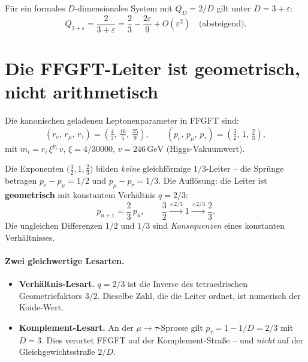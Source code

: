 Für ein formales \(D\)-dimensionales System mit \(Q_D = 2/D\) gilt
unter \(D = 3+\varepsilon\):
\begin{equation}
  Q_{3+\varepsilon} = \frac{2}{3+\varepsilon}
  = \frac{2}{3} - \frac{2\varepsilon}{9} + O(\varepsilon^2)
  \quad \text{(absteigend)}.
\end{equation}

\section{Die FFGFT-Leiter ist geometrisch, nicht arithmetisch}
\label{sec:leiter}

Die kanonischen geladenen Leptonenparameter in FFGFT
\cite{Pascher2026,PascherDok006} sind:
\begin{equation}
  (r_e,\, r_\mu,\, r_\tau) = \left(\tfrac{4}{3},\, \tfrac{16}{5},\, \tfrac{25}{9}\right),
  \qquad
  (p_e,\, p_\mu,\, p_\tau) = \left(\tfrac{3}{2},\, 1,\, \tfrac{2}{3}\right),
\end{equation}
mit \(m_i = r_i\,\xi^{p_i}\,v\), \(\xi = 4/30000\),
\(v = 246\,\text{GeV}\) (Higgs-Vakuumwert).

Die Exponenten \(\bigl(\tfrac{3}{2}, 1, \tfrac{2}{3}\bigr)\) bilden
\emph{keine} gleichförmige \(1/3\)-Leiter -- die Sprünge betragen
\(p_e - p_\mu = 1/2\) und \(p_\mu - p_\tau = 1/3\).
Die Auflösung: die Leiter ist \textbf{geometrisch} mit konstantem
Verhältnis \(q = 2/3\):
\begin{equation}
  p_{n+1} = \frac{2}{3}\,p_n, \qquad
  \frac{3}{2} \xrightarrow{\times 2/3} 1 \xrightarrow{\times 2/3} \frac{2}{3}.
\end{equation}
Die ungleichen Differenzen \(1/2\) und \(1/3\) sind \emph{Konsequenzen}
eines konstanten Verhältnisses.

\paragraph{Zwei gleichwertige Lesarten.}
\begin{itemize}
  \item \textbf{Verhältnis-Lesart.} \(q = 2/3\) ist die Inverse des
        tetraedrischen Geometriefaktors \(3/2\). Dieselbe Zahl, die die
        Leiter ordnet, ist numerisch der Koide-Wert.
  \item \textbf{Komplement-Lesart.} An der \(\mu\to\tau\)-Sprosse gilt
        \(p_\tau = 1 - 1/D = 2/3\) mit \(D=3\). Dies verortet FFGFT auf
        der Komplement-Straße -- und \emph{nicht} auf der
        Gleichgewichtsstraße \(2/D\).
\end{itemize}

